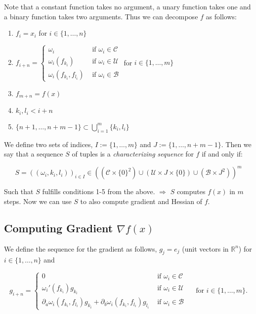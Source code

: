 \documentclass[11pt,a4paper]{article}
\def\R{{\mathbb R}}
\theoremstyle{definition} %
\begin{document}
Note that a constant function takes no argument, a unary function takes one
and a binary function takes two arguments.
Thus we can decompose $f$ as follows:

\begin{enumerate}[(1)]
	\item $f_i = x_i$ for $i \in \{
		      1, \ldots, n
		      \} $
	\item $f_{i + n} = \begin{cases}
			      \omega_i                    & \text{ if } \omega_i \in \mathcal{C} \\
			      \omega_i (f_{k_i})          & \text{ if } \omega_i \in \mathcal{U} \\
			      \omega_i (f_{k_i}, f_{l_i}) & \text{ if } \omega_i \in \mathcal{B}
		      \end{cases}$
	      \qquad for $i \in \{
		      1, \ldots, m
		      \}$
	\item $f_{m + n} = f(x)$
	\item $k_i, l_i < i + n$  
	\item $\{
		      n+1, \ldots, n+m - 1
		      \} \subset \bigcup_{i=1}^{m} \{
		      k_i, l_i
		      \}$
\end{enumerate}

We define two sets of indices, $I := \{
	1, \ldots, m
	\} $ and $J := \{
	1, \ldots, n+m-1
	\} $.
Then we say that a sequence $S$ of tuples is a \textit{characterizing sequence}
for $f$ if and only if:

\[
	S = \left(
	(\omega_i, k_i, l_i)
	\right)_{i \in I}
	\in \left(
	\left(
		\mathcal{C} \times \{
		0
		\}^2
		\right) \cup
	\left(
		\mathcal{U} \times J \times \{
		0
		\} \right) \cup
	\left(
		\mathcal{B} \times J^2
		\right)
	\right) ^m
\]

Such that $S$ fulfills conditions 1-5 from the above.
$\Rightarrow$ $S$ computes $f(x)$ in $m$ steps.
Now we can use $S$ to also compute gradient and Hessian of $f$.

\subsection{Computing Gradient $\nabla f(x)$}

We define the sequence for the gradient as follows,
$g_j = e_j$ (unit vectors in $\R^n$) for $i \in \{
	1, \ldots, n
	\} $ and

\[
	g_{i+n} = \begin{cases}
		0
		 & \text{ if } \omega_i \in \mathcal{C} \\
		\omega_i ' (f_{k_i}) g_{k_i}
		 & \text{ if } \omega_i \in \mathcal{U} \\
		\partial_a \omega_i (f_{k_i}, f_{l_i}) g_{k_i}
		+ \partial_b \omega_i (f_{k_i}, f_{l_i}) g_{l_i}
		 & \text{ if } \omega_i \in \mathcal{B}
	\end{cases} \quad \text{ for }
	i \in \{
	1, \ldots, m
	\}.
\]
\end{document}
